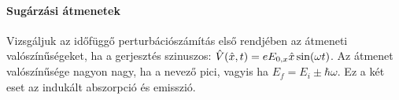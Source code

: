    \paragraph{Sugárzási átmenetek}
    
    Vizsgáljuk az időfüggő perturbációszámítás első rendjében az átmeneti valószínűségeket, ha a gerjesztés szinuszos: $\hat{V}(\hat{x},t)=e E_{0,x} \hat{x} \sin(\omega t)$. 
    Az átmenet valószínűsége nagyon nagy, ha a nevező pici, vagyis ha $E_f=E_i\pm\hbar\omega$. Ez a két eset az indukált abszorpció és emisszió.
   
   
   
   
   
   